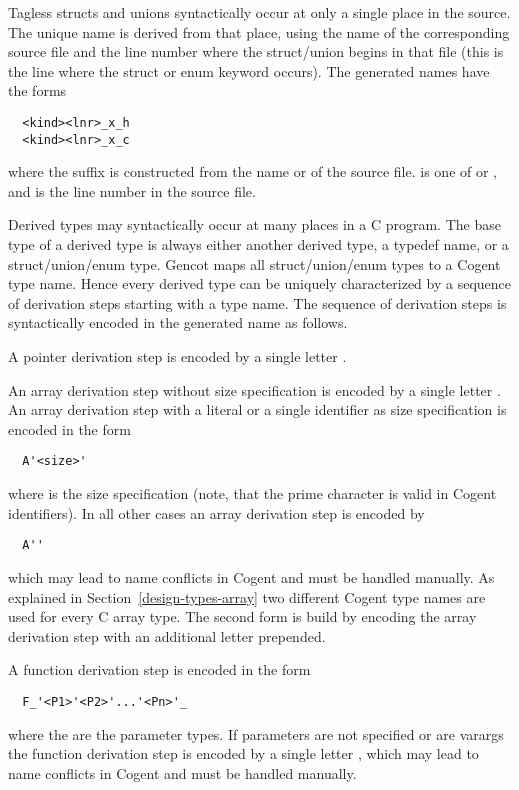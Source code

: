 Tagless structs and unions syntactically occur at only a single place in the source. The unique name is derived from 
that place, using the name of the corresponding source file and the line number where the struct/union begins
in that file (this is the line where the struct or enum keyword occurs).
The generated names have the forms
\begin{verbatim}
  <kind><lnr>_x_h
  <kind><lnr>_x_c
\end{verbatim}
where the suffix is constructed from the name  or  of the source file.  is one of
 or , and  is the line number in the source file.

Derived types may syntactically occur at many places in a C program. The base type of a derived
type is always either another derived type, a typedef name, or a struct/union/enum type. Gencot maps all
struct/union/enum types to a Cogent type name. Hence every derived type can be uniquely characterized by a sequence
of derivation steps starting with a type name. The sequence of derivation steps is syntactically encoded in the 
generated name as follows.

A pointer derivation step is encoded by a single letter . 

An array derivation step without size
specification is encoded by a single letter . An array derivation step with a literal or a single identifier
as size specification is encoded in the form
\begin{verbatim}
  A'<size>'
\end{verbatim}
where  is the size specification (note, that the prime character is valid in Cogent identifiers). 
In all other cases an array derivation step is encoded by
\begin{verbatim}
  A''
\end{verbatim}
which may lead to name conflicts in Cogent and must be handled manually. As explained in Section~\ref{design-types-array}
two different Cogent type names are used for every C array type. The second form is build by encoding 
the array derivation step with an additional letter  prepended.

A function derivation step is encoded in the form
\begin{verbatim}
  F_'<P1>'<P2>'...'<Pn>'_
\end{verbatim}
where the  are the parameter types. If parameters are not specified or are varargs the function
derivation step is encoded by a single letter , which may lead to name conflicts in Cogent and must 
be handled manually.

